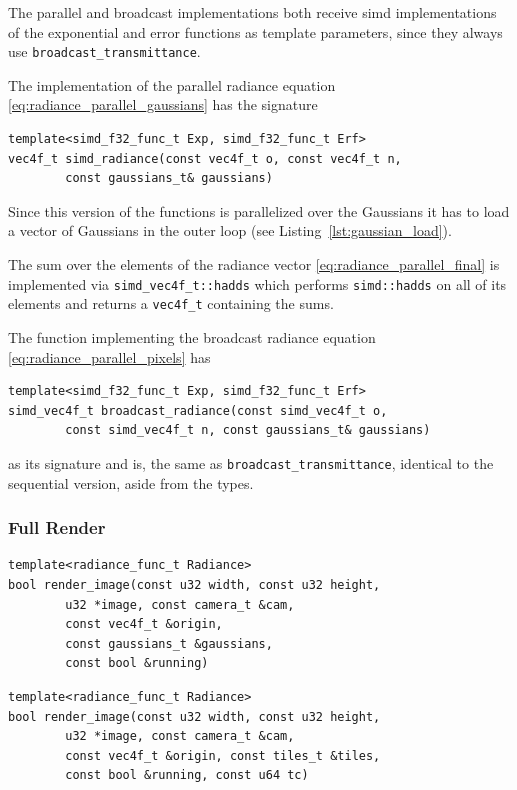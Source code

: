 \documentclass[a4paper, 11pt]{memoir}
\begin{document}
    The parallel and broadcast implementations both receive \gls{simd} implementations of the exponential and error
    functions as template parameters, since they always use \texttt{broadcast_transmittance}.

    The implementation of the parallel \gls{radiance} equation \eqref{eq:radiance_parallel_gaussians} has the signature
    \begin{verbatim}
template<simd_f32_func_t Exp, simd_f32_func_t Erf>
vec4f_t simd_radiance(const vec4f_t o, const vec4f_t n,
        const gaussians_t& gaussians)
    \end{verbatim}
    
    Since this version of the functions is parallelized over the Gaussians it has to load a vector of Gaussians in the
    outer loop (see Listing~\ref{lst:gaussian_load}).

    The sum over the elements of the \gls{radiance} vector \eqref{eq:radiance_parallel_final} is implemented via
    \texttt{simd_vec4f_t::hadds} which performs \texttt{simd::hadds} on all of its elements and returns
    a \texttt{vec4f_t} containing the sums.

    The function implementing the broadcast \gls{radiance} equation \eqref{eq:radiance_parallel_pixels} has
    \begin{verbatim}
template<simd_f32_func_t Exp, simd_f32_func_t Erf>
simd_vec4f_t broadcast_radiance(const simd_vec4f_t o,
        const simd_vec4f_t n, const gaussians_t& gaussians)
    \end{verbatim}
    as its signature and is, the same as \texttt{broadcast_transmittance}, identical to the sequential version,
    aside from the types.
    
    \subsubsection{Full Render}
    \begin{verbatim}
template<radiance_func_t Radiance>
bool render_image(const u32 width, const u32 height,
        u32 *image, const camera_t &cam,
        const vec4f_t &origin,
        const gaussians_t &gaussians,
        const bool &running)
    \end{verbatim}

    \begin{verbatim}
template<radiance_func_t Radiance>
bool render_image(const u32 width, const u32 height,
        u32 *image, const camera_t &cam,
        const vec4f_t &origin, const tiles_t &tiles,
        const bool &running, const u64 tc)
    \end{verbatim}
\end{document}
